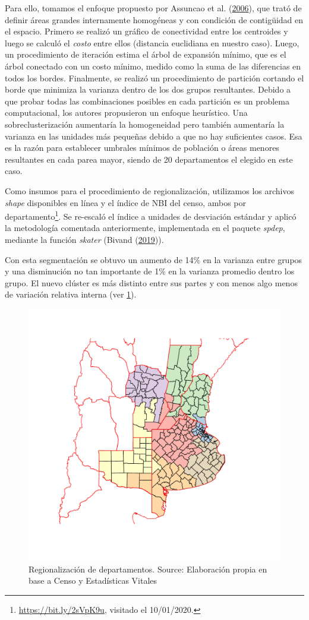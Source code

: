 \documentclass[12pt,]{article}
\begin{document}
Para ello, tomamos el enfoque propuesto por Assuncao et al.
(\protect\hyperlink{ref-AssunCao2006}{2006}), que trató de definir áreas
grandes internamente homogéneas y con condición de contigüidad en el
espacio. Primero se realizó un gráfico de conectividad entre los
centroides y luego se calculó el \emph{costo} entre ellos (distancia
euclidiana en nuestro caso). Luego, un procedimiento de iteración estima
el árbol de expansión mínimo, que es el árbol conectado con un costo
mínimo, medido como la suma de las diferencias en todos los bordes.
Finalmente, se realizó un procedimiento de partición cortando el borde
que minimiza la varianza dentro de los dos grupos resultantes. Debido a
que probar todas las combinaciones posibles en cada partición es un
problema computacional, los autores propusieron un enfoque heurístico.
Una sobreclusterización aumentaría la homogeneidad pero también
aumentaría la varianza en las unidades más pequeñas debido a que no hay
suficientes casos. Esa es la razón para establecer umbrales mínimos de
población o áreas menores resultantes en cada parea mayor, siendo de 20
departamentos el elegido en este caso.

Como insumos para el procedimiento de regionalización, utilizamos los
archivos \emph{shape} disponibles en línea y el índice de NBI del censo,
ambos por departamento\footnote{\url{https://bit.ly/2sVpK9u}, visitado
  el 10/01/2020.}. Se re-escaló el índice a unidades de desviación
estándar y aplicó la metodología comentada anteriormente, implementada
en el paquete \emph{spdep}, mediante la función \emph{skater} (Bivand
(\protect\hyperlink{ref-Bivand2019}{2019})).

Con esta segmentación se obtuvo un aumento de 14\% en la varianza entre
grupos y una disminución no tan importante de 1\% en la varianza
promedio dentro los grupo. El nuevo clúster es más distinto entre sus
partes y con menos algo menos de variación relativa interna (ver
\ref{fig:cluster}).

\begin{figure}

{\centering \includegraphics[width=0.7\linewidth]{analysis/plots/cluster} 

}

\caption{Regionalización de departamentos. Source: Elaboración propia en base a Censo y Estadísticas Vitales}\label{fig:cluster}
\end{figure}
\end{document}
